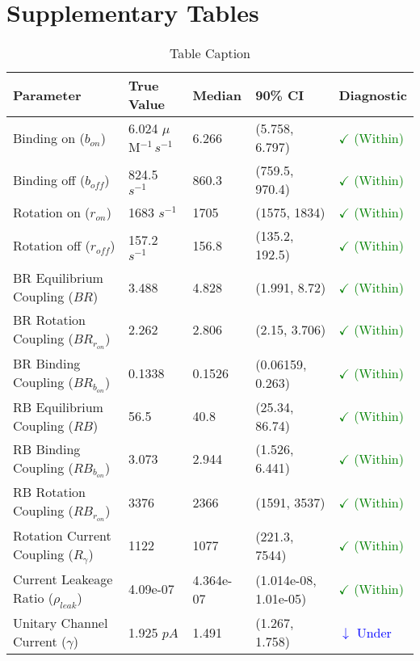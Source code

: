 \documentclass[12pt]{article}
\begin{document}
\section*{Supplementary Tables}
\label{sec:supp-tables}
\begin{table}[
	htbp
	]
	\centering
	\caption{Table Caption}\label{tab:example}
	\begin{tabular}{@{}lllll@{}}
		\hline
		Parameter & True Value & Median & 90\% CI & Diagnostic \\
		\hline
		Binding on ($b_{on}$) & 6.024 $\mu$M$^{-1}\,s^{-1}$ & 6.266 & (5.758, 6.797) & \textcolor{green}{$\checkmark$ (Within)} \\
		Binding off ($b_{off}$) & 824.5 $s^{-1}$ & 860.3 & (759.5, 970.4) & \textcolor{green}{$\checkmark$ (Within)} \\
		Rotation on ($r_{on}$) & 1683 $s^{-1}$ & 1705 & (1575, 1834) & \textcolor{green}{$\checkmark$ (Within)} \\
		Rotation off ($r_{off}$) & 157.2 $s^{-1}$ & 156.8 & (135.2, 192.5) & \textcolor{green}{$\checkmark$ (Within)} \\
		BR Equilibrium Coupling ($BR$) & 3.488  & 4.828 & (1.991, 8.72) & \textcolor{green}{$\checkmark$ (Within)} \\
		BR Rotation Coupling ($BR_{r_{on}}$) & 2.262  & 2.806 & (2.15, 3.706) & \textcolor{green}{$\checkmark$ (Within)} \\
		BR Binding Coupling ($BR_{b_{on}}$) & 0.1338  & 0.1526 & (0.06159, 0.263) & \textcolor{green}{$\checkmark$ (Within)} \\
		RB Equilibrium Coupling ($RB$) & 56.5  & 40.8 & (25.34, 86.74) & \textcolor{green}{$\checkmark$ (Within)} \\
		RB Binding Coupling ($RB_{b_{on}}$) & 3.073  & 2.944 & (1.526, 6.441) & \textcolor{green}{$\checkmark$ (Within)} \\
		RB Rotation Coupling ($RB_{r_{on}}$) & 3376  & 2366 & (1591, 3537) & \textcolor{green}{$\checkmark$ (Within)} \\
		Rotation Current Coupling ($R_{\gamma}$) & 1122  & 1077 & (221.3, 7544) & \textcolor{green}{$\checkmark$ (Within)} \\
		Current Leakeage Ratio ($\rho_{leak}$) & 4.09e-07  & 4.364e-07 & (1.014e-08, 1.01e-05) & \textcolor{green}{$\checkmark$ (Within)} \\
		Unitary Channel Current ($\gamma$) & 1.925 $pA$ & 1.491 & (1.267, 1.758) & \textcolor{blue}{$\downarrow$ Under} \\

\end{tabular}
\end{table}
\end{document}
